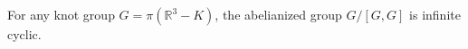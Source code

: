 For any knot group $G = \pi(\mathbb{R}^3 - K)$, the abelianized group $G/[G,G]$ is infinite cyclic.
